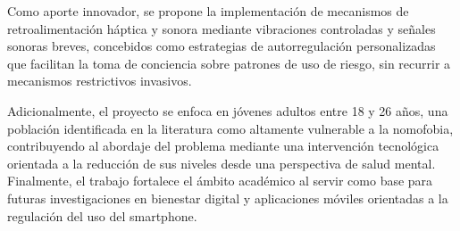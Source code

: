 Como aporte innovador, se propone la implementación de mecanismos de retroalimentación háptica y sonora mediante vibraciones controladas y señales sonoras breves, concebidos como estrategias de autorregulación personalizadas que facilitan la toma de conciencia sobre patrones de uso de riesgo, sin recurrir a mecanismos restrictivos invasivos.

Adicionalmente, el proyecto se enfoca en jóvenes adultos entre 18 y 26 años, una población identificada en la literatura como altamente vulnerable a la nomofobia, contribuyendo al abordaje del problema mediante una intervención tecnológica orientada a la reducción de sus niveles desde una perspectiva de salud mental. Finalmente, el trabajo fortalece el ámbito académico al servir como base para futuras investigaciones en bienestar digital y aplicaciones móviles orientadas a la regulación del uso del smartphone.